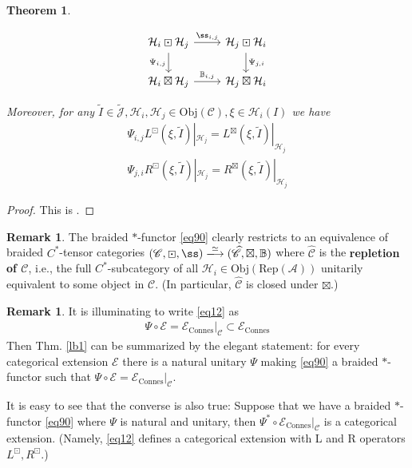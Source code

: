 \documentclass[11pt,b5paper,notitlepage]{article}
\theoremstyle{definition}
\newtheorem{rem}[df]{Remark}
\theoremstyle{plain}
\newtheorem{thm}[df]{Theorem}
\newcommand{\mc}{\mathcal}
\newcommand{\wtd}{\widetilde}
\newcommand{\wht}{\widehat}
\newcommand{\Rep}{\mathrm{Rep}}
\newcommand{\scr}{\mathscr}
\newcommand{\mbb}{\mathbb}
\newcommand{\Obj}{\mathrm{Obj}}
\newcommand{\Connes}{\mathrm{Connes}}
\numberwithin{equation}{section}
\begin{document}
\begin{thm}
\begin{enumerate}[label=(\alph*)]
\begin{equation*}
\begin{tikzcd}
\mc H_i\boxdot\mc H_j \arrow[d,"\Psi_{i,j}"'] \arrow[r,"\ss_{i,j}"] & \mc H_j\boxdot\mc H_i \arrow[d,"\Psi_{j,i}"] \\
\mc H_i\boxtimes\mc H_j \arrow[r,"\mbb B_{i,j}"]           & \mc H_j\boxtimes\mc H_i          
\end{tikzcd}
\end{equation*}
\end{enumerate}
Moreover, for any $\wtd I\in\wtd{\mc J},\mc H_i,\mc H_j\in\Obj(\scr C),\xi\in\mc H_i(I)$ we have
\begin{subequations}\label{eq12}
\begin{gather}
\Psi_{i,j}L^{\boxdot}(\xi,\wtd I)|_{\mc H_j}=L^{\boxtimes}(\xi,\wtd I)|_{\mc H_j}\\
\Psi_{j,i}R^{\boxdot}(\xi,\wtd I)|_{\mc H_j}=R^{\boxtimes}(\xi,\wtd I)|_{\mc H_j}
\end{gather}
\end{subequations}
\end{thm}



\begin{proof}
This is \cite[Thm. 3.10]{Gui21a}.
\end{proof}

\begin{rem}\label{lb38}
The braided $*$-functor \eqref{eq90} clearly restricts to an equivalence of braided $C^*$-tensor categories $(\scr C,\boxdot,\ss)\xlongrightarrow{\simeq}(\wht{\scr C},\boxtimes,\mathbb B)$ where $\wht{\scr C}$ is the \textbf{repletion of $\scr C$}, i.e., the full $C^*$-subcategory of all $\mc H_i\in\Obj(\Rep(\mc A))$ unitarily equivalent to some object in $\scr C$. (In particular, $\wht{\scr C}$ is closed under $\boxtimes$.)
\end{rem}


\begin{rem}\label{lb99}
It is illuminating to write \eqref{eq12} as
\begin{align}
\Psi\circ\scr E=\scr E_\Connes|_{\scr C}\subset\scr E_{\mathrm{Connes}}
\end{align}
Then Thm. \ref{lb1} can be summarized by the elegant statement: for every categorical extension $\scr E$ there is a natural unitary $\Psi$ making \eqref{eq90} a braided $*$-functor such that $\Psi\circ\scr E=\scr E_{\mathrm{Connes}}|_{\scr C}$. 

It is easy to see that the converse is also true: Suppose that we have a braided $*$-functor \eqref{eq90} where $\Psi$ is natural and unitary, then  $\Psi^*\circ\scr E_{\mathrm{Connes}}|_{\scr C}$ is a categorical extension. (Namely, \eqref{eq12} defines a categorical extension with L and R operators $L^\boxdot,R^\boxdot$.)
\end{rem}
\end{document}
